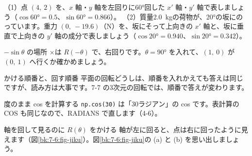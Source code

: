 \begin{jibun}
（1）\nobreak 点 $(4,\ 2)$ を、$x$ 軸・$y$ 軸を左回りに60°回した $x'$ 軸・$y'$ 軸で表しましょう（$\cos60°=0.5$、$\sin60°=0.866$）。\newline
（2）\nobreak 質量\qty{2.0}{kg}の荷物が、20°の坂にのっています。重力 $(0,\ -19.6)$（N）を、坂にそって上向きの $x'$ 軸と、坂に垂直で上向きの $y'$ 軸の成分で表しましょう（$\cos20°=0.940$、$\sin20°=0.342$）。
\end{jibun}


\begin{tsumazuki}{$-\sin\theta$ の場所}
×は $R(-\theta)$ で、右回りです。$\theta=90°$ を入れて、$(1,\ 0)$ が $(0,\ 1)$ へ行くか確かめましょう。
\end{tsumazuki}

\begin{tsumazuki}{かける順番と、回す順番}
平面の回転どうしは、順番を入れかえても答えは同じですが、読み方は大事です。7-7 の3次元の回転では、順番で答えが変わります。
\end{tsumazuki}

\begin{tsumazuki}{度のまま cos を計算する}
\texttt{np.cos(30)} は「30ラジアン」の cos です。表計算の COS も同じなので、RADIANS で直します（4-6）。
\end{tsumazuki}

\begin{tsumazuki}{軸を回して見るのに $R(\theta)$ をかける}
軸が左に回ると、点は右に回ったように見えます（図\ref{bk:7-6:fig-jiku}）。図\ref{bk:7-6:fig-jiku}の (a) と (b) を思い出しましょう。
\end{tsumazuki}

